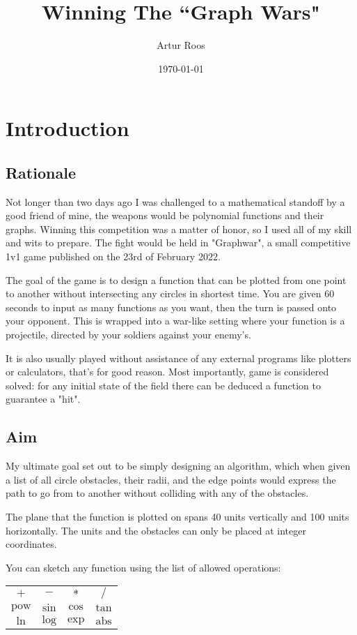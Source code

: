 \documentclass[12pt, titlepage]{article}
\title{Winning The ``Graph Wars"}
\author{Artur Roos}
\date{\today}
\begin{document}
\maketitle
\tableofcontents

\section{Introduction}
\subsection{Rationale}
Not longer than two days ago I was challenged to a mathematical standoff by a 
good friend of mine, the weapons would be polynomial functions and their 
graphs. Winning this competition was a matter of honor, so I used all of my 
skill and wits to prepare. The fight would be held in \mbox{"Graphwar"}, a 
small competitive 1v1 game published on the 23rd of February 2022. 

The goal of the game is to design a function that can be plotted from one point
to another without intersecting any circles in shortest time. You are given 
60 seconds to input as many functions as you want, then the turn is passed onto
your opponent.
This is wrapped into a war-like setting where your function is a projectile, 
directed by your soldiers against your enemy's.

It is also usually played without assistance of any external programs like 
plotters or calculators, that's for good reason. Most importantly, game is
considered solved: for any initial state of the field there can be deduced a 
function to guarantee a "hit". 

\subsection{Aim}
My ultimate goal set out to be simply designing an algorithm, which when given
a list of all circle obstacles, their radii, and the edge points would express
the path to go from to another without colliding with any of the obstacles. 

The plane that the function is plotted on spans 40 units vertically and 
100 units horizontally. The units and the obstacles can only be placed at 
integer coordinates. 

You can sketch any function using the list of allowed 
operations:

{
\centering
\begin{tabular}{c c c c}
    $+$ & $-$ & $*$ & $/$ \\
    $\mathrm{pow}$ & $\mathrm{sin}$ & $\mathrm{cos}$ & $\mathrm{tan}$\\
    $\mathrm{ln}$ & $\mathrm{log}$ & $\mathrm{exp}$ & $\mathrm{abs}$\\
\end{tabular}\par
}
\end{document}

